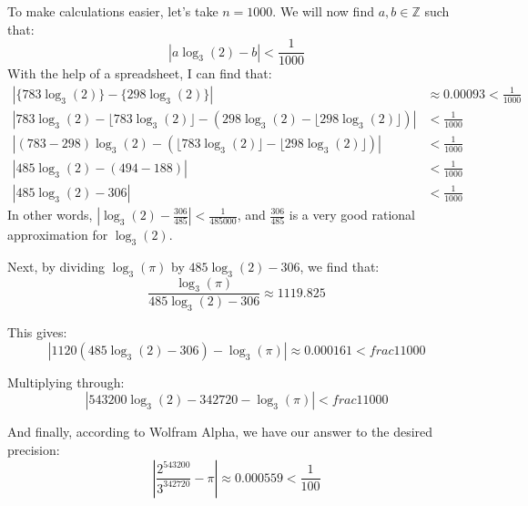 \documentclass{article}
\begin{document}
To make calculations easier, let's take $n = 1000$. We will now find $a,b \in \mathbb{Z}$ such that:
\[ \left| a\log_3(2) - b \right| < \frac{1}{1000} \]
With the help of a spreadsheet, I can find that:
\begin{align*}
	\left| \{783\log_3(2)\} - \{298\log_3(2)\}\right| &\approx 0.00093 < \frac{1}{1000} \\
	\left| 783\log_3(2) - \lfloor 783\log_3(2) \rfloor - (298\log_3(2) - \lfloor 298 \log_3(2) \rfloor) \right| &< \frac{1}{1000} \\
	\left| (783 - 298)\log_3(2) - (\lfloor 783\log_3(2) \rfloor - \lfloor 298 \log_3(2) \rfloor) \right| &< \frac{1}{1000} \\
	\left| 485\log_3(2) - (494 - 188) \right| &< \frac{1}{1000} \\
	\left| 485\log_3(2) - 306 \right| &< \frac{1}{1000} 
\end{align*}
In other words, $\left| \log_3(2) - \frac{306}{485} \right| < \frac{1}{485000}$, and $\frac{306}{485}$ is a very good rational
approximation for $\log_3(2)$.

Next, by dividing $\log_3(\pi)$ by $485\log_3(2) - 306$, we find that:
\[ \frac{\log_3(\pi)}{485\log_3(2) - 306} \approx 1119.825 \]

This gives:
\[ \left| 1120(485\log_3(2) - 306) - \log_3(\pi) \right| \approx 0.000161 < frac{1}{1000} \]

Multiplying through:
\[ \left| 543200\log_3(2) - 342720 - \log_3(\pi) \right| < frac{1}{1000} \]

And finally, according to Wolfram Alpha, we have our answer to the desired precision:
\[ \left| \frac{2^{543200}}{3^{342720}} - \pi \right| \approx 0.000559 < \frac{1}{100} \]
\end{document}
